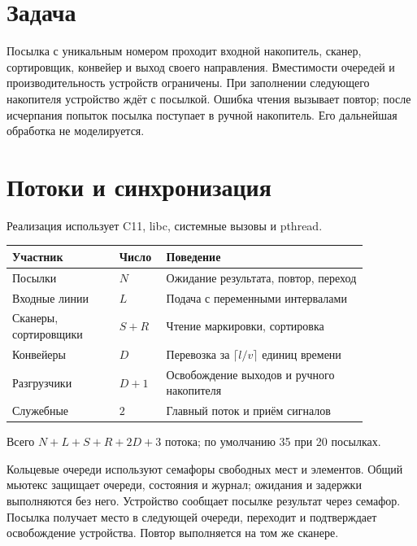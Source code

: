 \section{Задача}
\begin{definition}
Посылка с уникальным номером проходит входной накопитель, сканер, сортировщик, конвейер и выход своего направления. Вместимости очередей и производительность устройств ограничены. При заполнении следующего накопителя устройство ждёт с посылкой. Ошибка чтения вызывает повтор; после исчерпания попыток посылка поступает в ручной накопитель. Его дальнейшая обработка не моделируется.
\end{definition}

\section{Потоки и синхронизация}
Реализация использует C11, libc, системные вызовы и pthread.
\begin{center}
\begin{tabular}{p{0.27\linewidth}p{0.09\linewidth}p{0.51\linewidth}}
\toprule
Участник & Число & Поведение \\
\midrule
Посылки & $N$ & Ожидание результата, повтор, переход \\
Входные линии & $L$ & Подача с переменными интервалами \\
Сканеры, сортировщики & $S+R$ & Чтение маркировки, сортировка \\
Конвейеры & $D$ & Перевозка за $\lceil l/v\rceil$ единиц времени \\
Разгрузчики & $D+1$ & Освобождение выходов и ручного накопителя \\
Служебные & $2$ & Главный поток и приём сигналов \\
\bottomrule
\end{tabular}
\end{center}
Всего $N+L+S+R+2D+3$ потока; по умолчанию 35 при 20 посылках.

\begin{remark}
Кольцевые очереди используют семафоры свободных мест и элементов. Общий мьютекс защищает очереди, состояния и журнал; ожидания и задержки выполняются без него. Устройство сообщает посылке результат через семафор. Посылка получает место в следующей очереди, переходит и подтверждает освобождение устройства. Повтор выполняется на том же сканере.
\end{remark}


